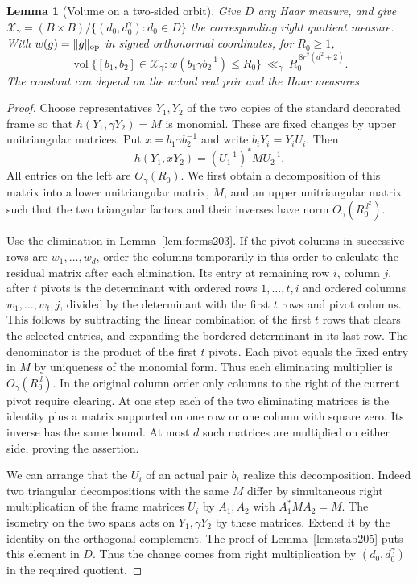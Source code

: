 \documentclass[a4paper,11pt]{article}
\newtheorem{lemma}[proposition]{Lemma}
\theoremstyle{definition}
\theoremstyle{remark}
\numberwithin{equation}{section}
\begin{document}
\begin{lemma}[Volume on a two-sided orbit]\label{lem:orbitvol207}
Give \(D\) any Haar measure, and give
\(\mathcal X_\gamma=(B\times B)/\{(d_0,d_0^\gamma):d_0\in D\}\)
the corresponding right quotient measure. With \(w(g)=\|g\|_{\rm op}\)
in signed orthonormal coordinates, for \(R_0\ge1\),
\[
 \operatorname{vol}\{[b_1,b_2]\in\mathcal X_\gamma:
                   w(b_1\gamma b_2^{-1})\le R_0\}
       \ \ll_\gamma\ R_0^{\,8r^2(d^2+2)} .
\]
The constant can depend on the actual real pair and the Haar measures.
\end{lemma}
\begin{proof}
Choose representatives \(Y_1,Y_2\) of the two copies of the
standard decorated frame so that \(h(Y_1,\gamma Y_2)=M\) is
monomial. These are fixed changes by upper unitriangular matrices.
Put \(x=b_1\gamma b_2^{-1}\) and write
\(b_iY_i=Y_i U_i\). Then
\[
             h(Y_1,xY_2)= (U_1^{-1})^* M U_2^{-1}.
\]
All entries on the left are \(O_\gamma(R_0)\).
We first obtain a decomposition of this matrix into a lower
unitriangular matrix, \(M\), and an upper unitriangular matrix
such that the two triangular factors and their inverses have
norm \(O_\gamma(R_0^{d^2})\).

Use the elimination in Lemma~\ref{lem:forms203}. If the pivot
columns in successive rows are \(w_1,\ldots,w_d\), order the
columns temporarily in this order to calculate the residual matrix
after each elimination. Its entry at remaining row \(i\), column
\(j\), after \(t\) pivots is the determinant with ordered rows
\(1,\ldots,t,i\) and ordered columns \(w_1,\ldots,w_t,j\),
divided by the determinant with the first \(t\) rows and pivot
columns. This follows by subtracting the linear combination of
the first \(t\) rows that clears the selected entries, and expanding
the bordered determinant in its last row. The denominator is the
product of the first \(t\) pivots. Each pivot equals the fixed
entry in \(M\) by uniqueness of the monomial form. Thus each
eliminating multiplier is \(O_\gamma(R_0^d)\). In the original
column order only columns to the right of the current pivot require
clearing. At one step each of the two eliminating matrices is the
identity plus a matrix supported on one row or one column with
square zero. Its inverse has the same bound. At most \(d\) such
matrices are multiplied on either side, proving the assertion.

We can arrange that the \(U_i\) of an actual pair \(b_i\) realize
this decomposition. Indeed two triangular decompositions with the
same \(M\) differ by simultaneous right multiplication of the frame
matrices \(U_i\) by \(A_1,A_2\) with \(A_1^* M A_2=M\).
The isometry on the two spans acts on \(Y_1,\gamma Y_2\) by these
matrices. Extend it by the identity on the orthogonal complement.
The proof of Lemma~\ref{lem:stab205} puts this element in \(D\).
Thus the change comes from right multiplication by
\((d_0,d_0^\gamma)\) in the required quotient.


\end{proof}
\end{document}
